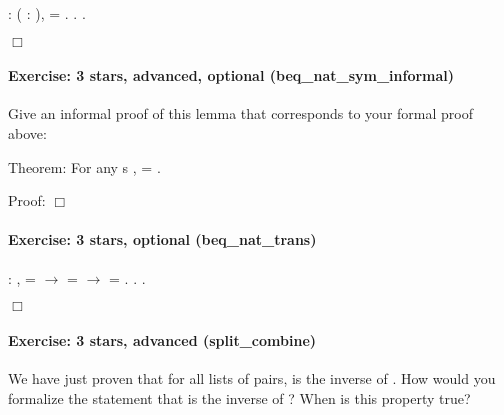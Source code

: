 \documentclass[12pt]{report}
\begin{document}
\begin{coqdoccode}
\coqdocnoindent
{}  : \coqdockw{\ensuremath{\forall}} (  : ),\coqdoceol
\coqdocindent{1.00em}
   =   .\coqdoceol
\coqdocnoindent
{}.\coqdoceol
 .\coqdoceol
\end{coqdoccode}
\ensuremath{\Box} 

\paragraph{Exercise: 3 stars, advanced, optional (beq\_nat\_sym\_informal)}

 Give an informal proof of this lemma that corresponds to your
    formal proof above:


   Theorem: For any s  ,    =   .


   Proof:
   \ensuremath{\Box}
 

\paragraph{Exercise: 3 stars, optional (beq\_nat\_trans)}

\begin{coqdoccode}
\coqdocnoindent
{}  : \coqdockw{\ensuremath{\forall}}   ,\coqdoceol
\coqdocindent{1.00em}
   =  \ensuremath{\rightarrow}\coqdoceol
\coqdocindent{1.00em}
   =  \ensuremath{\rightarrow}\coqdoceol
\coqdocindent{1.00em}
   = .\coqdoceol
\coqdocnoindent
{}.\coqdoceol
 .\coqdoceol
\end{coqdoccode}
\ensuremath{\Box} 

\paragraph{Exercise: 3 stars, advanced (split\_combine)}

 We have just proven that for all lists of pairs,  is the
    inverse of .  How would you formalize the statement that
     is the inverse of ? When is this property true?
\end{document}

